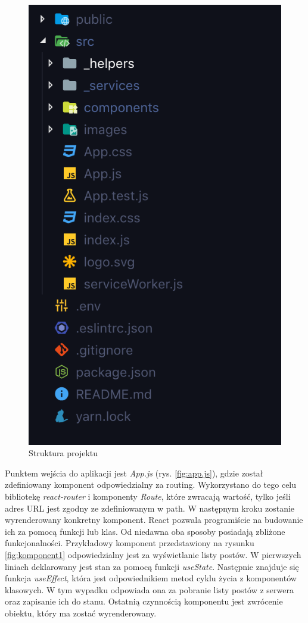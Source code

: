 \documentclass[declaration,shortabstract]{iithesis}
\begin{document}
\begin{figure}
    \centering
    \includegraphics[]{images/forontend.png}  
    \caption{Struktura projektu}
    \label{fig:frontend_struct}
\end{figure}

Punktem wejścia do aplikacji jest \textit{App.js} (rys. \ref{fig:app.js}), gdzie został zdefiniowany komponent odpowiedzialny za routing. Wykorzystano do tego celu bibliotekę \textit{react-router} i komponenty \textit{Route}, które zwracają wartość, tylko jeśli adres URL jest zgodny ze zdefiniowanym w path. W następnym kroku zostanie wyrenderowany konkretny komponent. React pozwala programiście na budowanie ich za pomocą funkcji lub klas. Od niedawna oba sposoby posiadają zbliżone funkcjonalności. Przykładowy komponent przedstawiony na rysunku \ref{fig:komponent1} odpowiedzialny jest za wyświetlanie listy postów. W pierwszych liniach deklarowany jest stan za pomocą funkcji \textit{useState}. Następnie znajduje się funkcja \textit{useEffect}, która jest odpowiednikiem metod cyklu życia z komponentów klasowych. W tym wypadku odpowiada ona za pobranie listy postów z serwera oraz zapisanie ich do stanu. Ostatnią czynnością komponentu jest zwrócenie obiektu, który ma zostać wyrenderowany.
\end{document}

